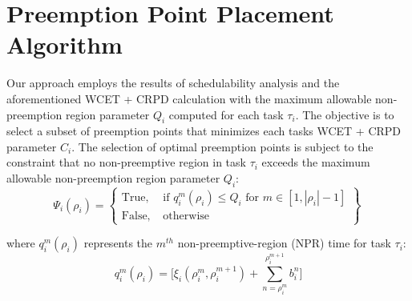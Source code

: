 \vspace{-10pt}
\section{Preemption Point Placement Algorithm}\label{sec:implementation}

Our approach employs the results of schedulability analysis and the aforementioned WCET + CRPD calculation with the maximum allowable non-preemption region parameter \begin{math}Q_{i}\end{math} computed for each task \begin{math}\tau_{i}\end{math}.  The objective is to select a subset of preemption points that minimizes each tasks WCET + CRPD parameter \begin{math}C_{i}\end{math}. The selection of optimal preemption points is subject to the constraint that no non-preemptive region in task \begin{math}\tau_{i}\end{math} exceeds the maximum allowable non-preemption region parameter \begin{math}Q_{i}\end{math}:
\begin{equation}\label{eqn:pp-constraint}
   \Psi_{i}(\rho_{i}) =
\left\{
\begin{array}{lr}
    \textrm{True, }&\textrm{if } q_{i}^{m}(\rho_{i}) \leq Q_{i} \textrm{ for } m \in [1,|\rho_{i}|-1] \\
    \textrm{False, }&\textrm{otherwise}
\end{array}
\right\}~
\end{equation}

\noindent
where \begin{math}q_{i}^{m}(\rho_{i})\end{math} represents the \begin{math}m^{th}\end{math} non-preemptive-region (NPR) time for task \begin{math}\tau_{i}\end{math}:
\begin{equation}\label{eqn:mthnpr-time}
   q_{i}^{m}(\rho_{i}) = \Big[\xi_{i}(\rho_{i}^{m},\rho_{i}^{m+1}) + \sum_{n=\rho_{i}^{m}}^{\rho_{i}^{m+1}}b_{i}^{n}\Big]
\end{equation}

